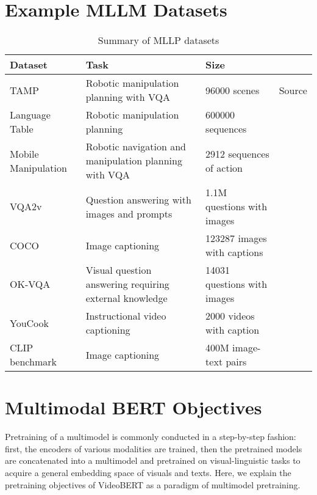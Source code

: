 \documentclass[11pt]{article}
\begin{document}

\newpage

\appendix

\section{Example MLLM Datasets}

\begin{table}[H]
    \centering
    \small
    \begin{tabular}{l|l|l|l|}
        \hline
        Dataset & Task & Size \\
        \hline
        TAMP & Robotic manipulation planning with VQA & 96000 scenes & Source\\
        Language Table & Robotic manipulation planning & 600000 sequences & \citet{DBLP:conf/icml/DriessXSLCIWTVY23}\\
        Mobile Manipulation & Robotic navigation and manipulation planning with VQA & 2912 sequences of action & \citet{DBLP:conf/icml/DriessXSLCIWTVY23}\\
        VQA2v & Question answering with images and prompts & 1.1M questions with images &\citet{DBLP:journals/ijcv/GoyalKASBP19}\\
        COCO & Image captioning & 123287 images with captions & \citet{DBLP:journals/corr/ChenFLVGDZ15}\\
        OK-VQA & Visual question answering requiring external knowledge & 14031 questions with images &\citet{DBLP:conf/cvpr/MarinoRFM19}\\
        YouCook & Instructional video captioning & 2000 videos with caption & \citet{DBLP:conf/iccv/SunMV0S19}\\
        CLIP benchmark & Image captioning & 400M image-text pairs & \citet{DBLP:conf/icml/RadfordKHRGASAM21}\\
        \hline
    \end{tabular}
    \caption{Summary of MLLP datasets}
    \onecolumn
\end{table}

\twocolumn
\section{Multimodal BERT Objectives}
\label{sec:appendix}
Pretraining of a multimodel is commonly conducted in a step-by-step fashion: first, the encoders of various modalities are trained, then the pretrained models are concatenated into a multimodel and pretrained on visual-linguistic tasks to acquire a general embedding space of visuals and texts. Here, we explain the pretraining objectives of VideoBERT \citep{DBLP:conf/iccv/SunMV0S19} as a paradigm of multimodel pretraining. 
\end{document}
